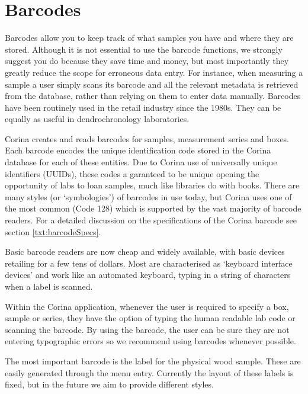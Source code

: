 \section{Barcodes}
\label{txt:barcodes}

Barcodes allow you to keep track of what samples you have and where they are stored.  Although it is not essential to use the barcode functions, we strongly suggest you do because they save time and money, but most importantly they greatly reduce the scope for erroneous data entry.  For instance, when measuring a sample a user simply scans its barcode and all the relevant metadata is retrieved from the database, rather than relying on them to enter data manually.  Barcodes have been routinely used in the retail industry since the 1980s.  They can be equally as useful in dendrochronology laboratories.

Corina creates and reads barcodes for samples, measurement series and boxes.  Each barcode encodes the unique identification code stored in the Corina database for each of these entities.  Due to Corina use of universally unique identifiers (UUIDs), these codes a garanteed to be unique opening the opportunity of labs to loan samples, much like libraries do with books.  There are many styles (or `symbologies') of barcodes in use today, but Corina uses one of the most common (Code 128) which is supported by the vast majority of barcode readers.  For a detailed discussion on the specifications of the Corina barcode see section \ref{txt:barcodeSpecs}.

Basic barcode readers are now cheap and widely available, with basic devices retailing for a few tens of dollars.  Most are characterised as `keyboard interface devices' and work like an automated keyboard, typing in a string of characters when a label is scanned.  

Within the Corina application, whenever the user is required to specify a box, sample or series, they have the option of typing the human readable lab code or scanning the barcode. By using the barcode, the user can be sure they are not entering typographic errors so we recommend using barcodes whenever possible. 

The most important barcode is the label for the physical wood sample.  These are easily generated through the  menu entry.  Currently the layout of these labels is fixed, but in the future we aim to provide different styles.  

